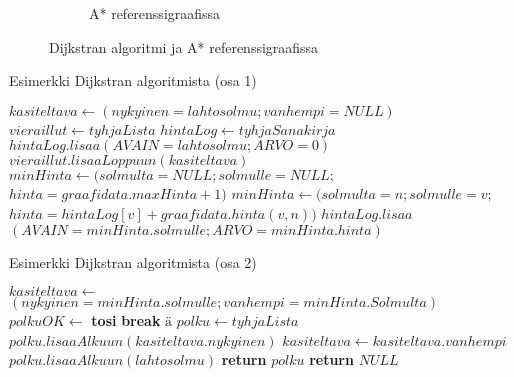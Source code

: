 \begin{figure}
\begin{subfigure}[b]{0.5\textwidth}
		\caption{A* referenssigraafissa}\label{refAStar}
	\end{subfigure}
	\caption{Dijkstran algoritmi ja A* referenssigraafissa}\label{DijkstraAStarFigs}
\end{figure}

\begin{algorithm}
\caption{Esimerkki Dijkstran algoritmista (osa 1)}\label{DijkstrEsim}
\begin{algorithmic}
	\State $kasiteltava \gets (nykyinen=lahtosolmu;vanhempi=NULL)$
	\State $vieraillut \gets tyhjaLista$
	\State $hintaLog \gets tyhjaSanakirja$
	\State $hintaLog.lisaa(AVAIN=lahtosolmu;ARVO=0)$
		\State $vieraillut.lisaaLoppuun(kasiteltava)$
		\State $minHinta \gets (solmulta=NULL;solmulle=NULL;$
		\State $hinta=graafidata.maxHinta+1)$
					\State $minHinta \gets (solmulta=n;solmulle=v;$
					\State $hinta=hintaLog[v]+graafidata.hinta(v,n))$
				\EndIf
			\EndFor
		\EndFor
		\State $hintaLog.lisaa$
		\State $(AVAIN=minHinta.solmulle;ARVO=minHinta.hinta)$

\end{algorithmic}
\end{algorithm}
\begin{algorithm}
\caption{Esimerkki Dijkstran algoritmista (osa 2)}
\begin{algorithmic}

		\State $kasiteltava \gets$
		\State $(nykyinen=minHinta.solmulle;vanhempi=minHinta.Solmulta)$
			\State $polkuOK \gets$ \textbf{ tosi}
			\State \textbf{break} $ä$
		\EndIf
	\EndWhile
		\State $polku \gets tyhjaLista$
			\State $polku.lisaaAlkuun(kasiteltava.nykyinen)$
			\State $kasiteltava \gets kasiteltava.vanhempi$
		\EndWhile
		\State $polku.lisaaAlkuun(lahtosolmu)$
		\State \textbf{return} $polku$
	\Else
		\State \textbf{return} $NULL$
	\EndIf
\EndProcedure
\end{algorithmic}
\end{algorithm}

